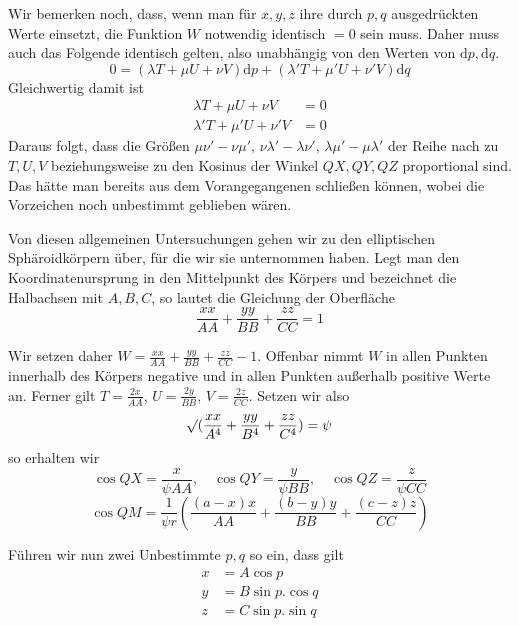 \par
Wir bemerken noch, dass, wenn man für $x,y,z$ ihre durch $p,q$ ausgedrückten Werte einsetzt, die Funktion $W$ notwendig identisch $=0$ sein muss. Daher muss auch das Folgende identisch gelten, also unabhängig von den Werten von $\mathrm{d}p,\mathrm{d}q$.
\[
0=(\lambda T+\mu U+\nu V)\mathrm{d}p+(\lambda'T+\mu'U+\nu'V)\mathrm{d}q
\]
Gleichwertig damit ist
\[
\begin{aligned}
\lambda T+\mu U+\nu V&=0\\
\lambda'T+\mu'U+\nu'V&=0
\end{aligned}
\]
Daraus folgt, dass die Größen $\mu\nu'-\nu\mu'$, $\nu\lambda'-\lambda\nu'$, $\lambda\mu'-\mu\lambda'$ der Reihe nach zu $T,U,V$ beziehungsweise zu den Kosinus der Winkel $QX,QY,QZ$ proportional sind. Das hätte man bereits aus dem Vorangegangenen schließen können, wobei die Vorzeichen noch unbestimmt geblieben wären.

\par
Von diesen allgemeinen Untersuchungen gehen wir zu den elliptischen Sphäroidkörpern über, für die wir sie unternommen haben. Legt man den Koordinatenursprung in den Mittelpunkt des Körpers und bezeichnet die Halbachsen mit $A,B,C$, so lautet die Gleichung der Oberfläche
\[
\frac{xx}{AA}+\frac{yy}{BB}+\frac{zz}{CC}=1
\]
\par
Wir setzen daher $W=\frac{xx}{AA}+\frac{yy}{BB}+\frac{zz}{CC}-1$. Offenbar nimmt $W$ in allen Punkten innerhalb des Körpers negative und in allen Punkten außerhalb positive Werte an. Ferner gilt $T=\frac{2x}{AA}$, $U=\frac{2y}{BB}$, $V=\frac{2z}{CC}$. Setzen wir also
\[
\mathord{{}^{}\!\surd}(\frac{xx}{A^4}+\frac{yy}{B^4}+\frac{zz}{C^4})=\psi
\]
so erhalten wir
\[
\cos QX=\frac{x}{\psi AA},\quad\cos QY=\frac{y}{\psi BB},\quad\cos QZ=\frac{z}{\psi CC}
\]
\[
\cos QM=\frac{1}{\psi r}(\frac{(a-x)x}{AA}+\frac{(b-y)y}{BB}+\frac{(c-z)z}{CC})
\]

\par
Führen wir nun zwei Unbestimmte $p,q$ so ein, dass gilt
\[
\begin{aligned}
x&=A\cos p\\
y&=B\sin p.\cos q\\
z&=C\sin p.\sin q
\end{aligned}
\]
